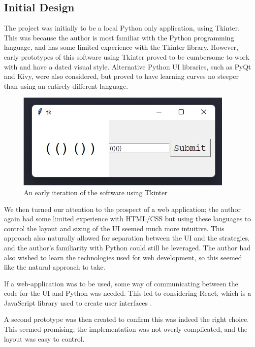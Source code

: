 \subsection{Initial Design}

The project was initially to be a local Python only application, using Tkinter. This was because the author is most familiar with the Python programming language, and has some limited experience with the Tkinter library. However, early prototypes of this software using Tkinter proved to be cumbersome to work with and have a dated visual style. Alternative Python UI libraries, such as PyQt and Kivy, were also considered, but proved to have learning curves no steeper than using an entirely different language.
\begin{figure}[H]
    \centering
    \includegraphics[scale = 0.7]{./images/tkinter-gui.jpeg}
    \caption{An early iteration of the software using Tkinter}
\end{figure}
\noindent We then turned our attention to the prospect of a web application; the author again had some limited experience with HTML/CSS but using these languages to control the layout and sizing of the UI seemed much more intuitive. This approach also naturally allowed for separation between the UI and the strategies, and the author's familiarity with Python could still be leveraged. The author had also wished to learn the technologies used for web development, so this seemed like the natural approach to take.


\par\null\par
\noindent If a web-application was to be used, some way of communicating between the code for the UI and Python was needed. This led to considering React, which is a JavaScript library used to create user interfaces \cite{whatisReact}.

\par\null\par
\noindent A second prototype was then created to confirm this was indeed the right choice. This seemed promising; the implementation was not overly complicated, and the layout was easy to control. 